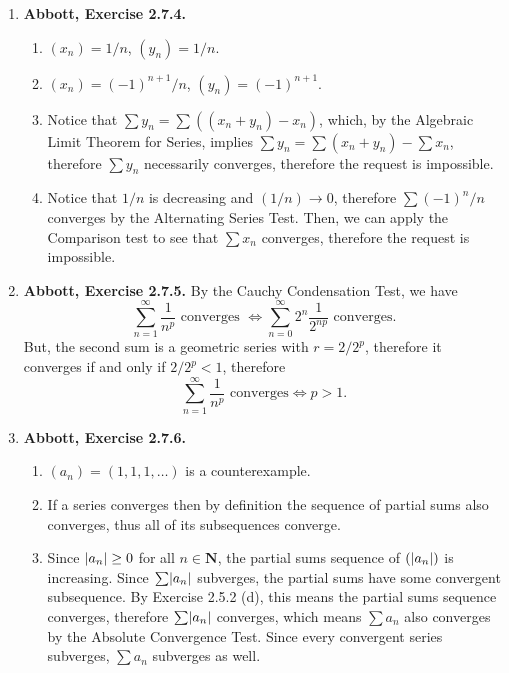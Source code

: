 \documentclass{article}
\DeclarePairedDelimiter\abs{\lvert}{\rvert}
\newcommand{\N}{\mathbf{N}}
\newcommand{\exc}[2][Abbott]{\item \textbf{#1, Exercise #2.}}
\begin{document}
\begin{enumerate}
    \exc{2.7.4}
    \begin{enumerate}
        \item $(x_n) = 1/n$, $(y_n) = 1/n$.
        
        \item $(x_n) = (-1)^{n+1}/n$, $(y_n) = (-1)^{n+1}$.
        
        \item Notice that $\sum y_n = \sum ((x_n + y_n) - x_n)$, which, by the Algebraic Limit Theorem for Series, implies $\sum y_n = \sum  (x_n + y_n) - \sum x_n$, therefore $\sum y_n$ necessarily converges, therefore the request is impossible.
        
        \item Notice that $1/n$ is decreasing and $(1/n) \to 0$, therefore $\sum (-1)^n/n$ converges by the Alternating Series Test. Then, we can apply the Comparison test to see that $\sum x_n$ converges, therefore the request is impossible.
    \end{enumerate}
    
    \exc{2.7.5} By the Cauchy Condensation Test, we have 
    \begin{equation*}
        \sum_{n=1}^\infty \frac{1}{n^p} \text{ converges } \iff 
        \sum_{n=0}^\infty 2^n \frac{1}{2^{n p}} \text{ converges.} 
    \end{equation*} But, the second sum is a geometric series with $r = 2/2^p$, therefore it converges if and only if $2/2^p < 1$, therefore 
    \begin{equation*}
        \sum_{n=1}^\infty \frac{1}{n^p} \text{ converges} \iff p > 1.
    \end{equation*}
    
    \exc{2.7.6}
    \begin{enumerate}
        \item $(a_n) = (1,1,1,\dots)$ is a counterexample.
        
        \item If a series converges then by definition the sequence of partial sums also converges, thus all of its subsequences converge.
        
        \item Since $\abs*{a_n} \geq 0$ for all $n \in \N$, the partial sums sequence of $(\abs*{a_n})$ is increasing. Since $\sum \abs*{a_n}$ subverges, the partial sums have some convergent subsequence. By Exercise 2.5.2 (d), this means the partial sums sequence converges, therefore $\sum \abs*{a_n}$ converges, which means $\sum a_n$ also converges by the Absolute Convergence Test. Since every convergent series subverges, $\sum a_n$ subverges as well.
        

\end{enumerate}
\end{enumerate}
\end{document}

